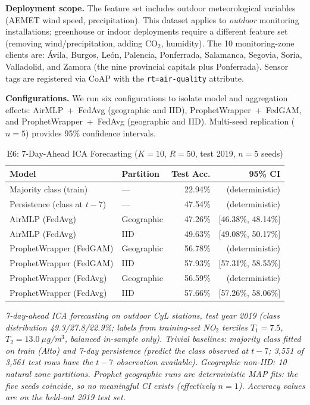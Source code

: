 ﻿\documentclass[journal]{IEEEtran}
\begin{document}
\textbf{Deployment scope.} The feature set includes outdoor meteorological variables (AEMET wind speed, precipitation). This dataset applies to \emph{outdoor} monitoring installations; greenhouse or indoor deployments require a different feature set (removing wind/precipitation, adding CO$_2$, humidity). The 10 monitoring-zone clients are: \'Avila, Burgos, Le\'on, Palencia, Ponferrada, Salamanca, Segovia, Soria, Valladolid, and Zamora (the nine provincial capitals plus Ponferrada). Sensor tags are registered via CoAP with the \texttt{rt=air-quality} attribute.

\textbf{Configurations.} We run six configurations to isolate model and aggregation effects: AirMLP~+~FedAvg (geographic and IID), ProphetWrapper~+~FedGAM, and ProphetWrapper~+~FedAvg (geographic and IID). Multi-seed replication ($n{=}5$) provides 95\% confidence intervals.

\begin{table}[t]
\centering
\caption{E6: 7-Day-Ahead ICA Forecasting ($K{=}10$, $R{=}50$, test 2019, $n{=}5$ seeds)}
\label{tab:e6}
\footnotesize
\begin{tabular}{l l r r}
\toprule
\textbf{Model} & \textbf{Partition} & \textbf{Test Acc.} & \textbf{95\% CI} \\
\midrule
Majority class (train)      & ---        & 22.94\% & (deterministic) \\
Persistence (class at $t{-}7$) & ---     & 47.54\% & (deterministic) \\
\midrule
AirMLP (FedAvg)             & Geographic & 47.26\% & [46.38\%, 48.14\%] \\
AirMLP (FedAvg)             & IID        & 49.63\% & [49.08\%, 50.17\%] \\
\midrule
ProphetWrapper (FedGAM)     & Geographic & 56.78\% & (deterministic) \\
ProphetWrapper (FedGAM)     & IID        & 57.93\% & [57.31\%, 58.55\%] \\
ProphetWrapper (FedAvg)     & Geographic & 56.59\% & (deterministic) \\
ProphetWrapper (FedAvg)     & IID        & 57.66\% & [57.26\%, 58.06\%] \\
\bottomrule
\end{tabular}
\vspace{0.5em}

\emph{7-day-ahead ICA forecasting on outdoor CyL stations, test year 2019 (class distribution 49.3/27.8/22.9\%; labels from training-set NO$_2$ terciles $T_1{=}7.5$, $T_2{=}13.0~\mu$g/m$^3$, balanced in-sample only). Trivial baselines: majority class fitted on train (\textit{Alto}) and 7-day persistence (predict the class observed at $t{-}7$; 3,551 of 3,561 test rows have the $t{-}7$ observation available). Geographic non-IID: 10 natural zone partitions. Prophet geographic runs are deterministic MAP fits: the five seeds coincide, so no meaningful CI exists (effectively $n{=}1$). Accuracy values are on the held-out 2019 test set.}
\end{table}
\end{document}
